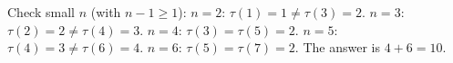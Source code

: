 Check small $n$ (with $n-1\ge1$): $n=2$: $\tau(1)=1\ne\tau(3)=2$. $n=3$: $\tau(2)=2\ne\tau(4)=3$. $n=4$: $\tau(3)=\tau(5)=2$. $n=5$: $\tau(4)=3\ne\tau(6)=4$. $n=6$: $\tau(5)=\tau(7)=2$. The answer is $4+6=\boxed{10}$.
